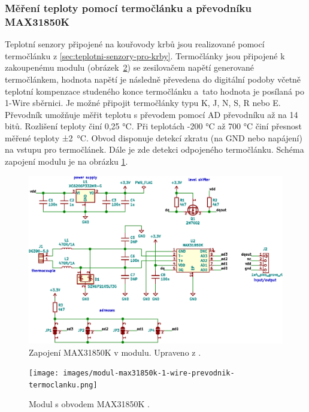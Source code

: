 \subsubsection{Měření teploty pomocí termočlánku a převodníku MAX31850K}
Teplotní senzory připojené na kouřovody krbů jsou realizované pomocí termočlánku z \ref{sec:teplotni-senzory-pro-krby}. Termočlánky jsou připojené k zakoupenému modulu (obrázek~\ref{fig:modul-max31850k-1-wire-prevodnik-termoclanku}) se zesilovačem napětí generované termočlánkem, hodnota napětí je následně převedena do digitální podoby včetně teplotní kompenzace studeného konce termočlánku a~tato hodnota je posílaná po 1-Wire sběrnici. Je možné připojit termočlánky typu K, J, N, S, R nebo E. Převodník umožňuje měřit teplotu s převodem pomocí AD převodníku až na 14 bitů. Rozlišení teploty činí 0,25 °C. Při teplotách -200 °C až 700 °C činí přesnost měřené teploty ±2~°C. Obvod disponuje detekcí zkratu (na GND nebo napájení) na vstupu pro termočlánek. Dále je zde detekci odpojeného termočlánku. Schéma zapojení modulu je na obrázku \ref{fig:zapojeni-max31850k-1-wire-prevodnik-termoclanku}.

\begin{figure}[H]
    \centering
    \includegraphics[width=\textwidth]{images/svg/kicad/zapojeni-max31850k-1-wire-prevodnik-termoclanku.eps}
    \caption[Zapojení MAX31850K v modulu.]{Zapojení MAX31850K v modulu. Upraveno z \cite{prevodnik-max31850k}.}
    \label{fig:zapojeni-max31850k-1-wire-prevodnik-termoclanku}
\end{figure}

\begin{figure}[H]
    \centering
    \texttt{[image: images/modul-max31850k-1-wire-prevodnik-termoclanku.png]}
    \caption[Modul s obvodem MAX31850K.]{Modul s obvodem MAX31850K \cite{prevodnik-max31850k}.}
    \label{fig:modul-max31850k-1-wire-prevodnik-termoclanku}
\end{figure}

